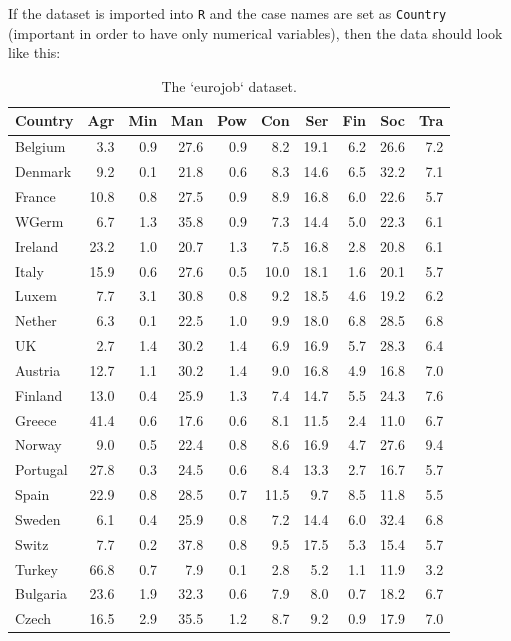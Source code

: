 \documentclass[]{book}
\theoremstyle{definition}
\theoremstyle{definition}
\theoremstyle{definition}
\theoremstyle{remark}
\begin{document}
If the dataset is imported into \texttt{R} and the case names are set as
\texttt{Country} (important in order to have only numerical variables),
then the data should look like this:

\begin{longtable}[t]{lrrrrrrrrr}
\caption{\label{tab:eurotable}The `eurojob` dataset.}\\
\toprule
Country & Agr & Min & Man & Pow & Con & Ser & Fin & Soc & Tra\\
\midrule
Belgium & 3.3 & 0.9 & 27.6 & 0.9 & 8.2 & 19.1 & 6.2 & 26.6 & 7.2\\
Denmark & 9.2 & 0.1 & 21.8 & 0.6 & 8.3 & 14.6 & 6.5 & 32.2 & 7.1\\
France & 10.8 & 0.8 & 27.5 & 0.9 & 8.9 & 16.8 & 6.0 & 22.6 & 5.7\\
WGerm & 6.7 & 1.3 & 35.8 & 0.9 & 7.3 & 14.4 & 5.0 & 22.3 & 6.1\\
Ireland & 23.2 & 1.0 & 20.7 & 1.3 & 7.5 & 16.8 & 2.8 & 20.8 & 6.1\\
\addlinespace
Italy & 15.9 & 0.6 & 27.6 & 0.5 & 10.0 & 18.1 & 1.6 & 20.1 & 5.7\\
Luxem & 7.7 & 3.1 & 30.8 & 0.8 & 9.2 & 18.5 & 4.6 & 19.2 & 6.2\\
Nether & 6.3 & 0.1 & 22.5 & 1.0 & 9.9 & 18.0 & 6.8 & 28.5 & 6.8\\
UK & 2.7 & 1.4 & 30.2 & 1.4 & 6.9 & 16.9 & 5.7 & 28.3 & 6.4\\
Austria & 12.7 & 1.1 & 30.2 & 1.4 & 9.0 & 16.8 & 4.9 & 16.8 & 7.0\\
\addlinespace
Finland & 13.0 & 0.4 & 25.9 & 1.3 & 7.4 & 14.7 & 5.5 & 24.3 & 7.6\\
Greece & 41.4 & 0.6 & 17.6 & 0.6 & 8.1 & 11.5 & 2.4 & 11.0 & 6.7\\
Norway & 9.0 & 0.5 & 22.4 & 0.8 & 8.6 & 16.9 & 4.7 & 27.6 & 9.4\\
Portugal & 27.8 & 0.3 & 24.5 & 0.6 & 8.4 & 13.3 & 2.7 & 16.7 & 5.7\\
Spain & 22.9 & 0.8 & 28.5 & 0.7 & 11.5 & 9.7 & 8.5 & 11.8 & 5.5\\
\addlinespace
Sweden & 6.1 & 0.4 & 25.9 & 0.8 & 7.2 & 14.4 & 6.0 & 32.4 & 6.8\\
Switz & 7.7 & 0.2 & 37.8 & 0.8 & 9.5 & 17.5 & 5.3 & 15.4 & 5.7\\
Turkey & 66.8 & 0.7 & 7.9 & 0.1 & 2.8 & 5.2 & 1.1 & 11.9 & 3.2\\
Bulgaria & 23.6 & 1.9 & 32.3 & 0.6 & 7.9 & 8.0 & 0.7 & 18.2 & 6.7\\
Czech & 16.5 & 2.9 & 35.5 & 1.2 & 8.7 & 9.2 & 0.9 & 17.9 & 7.0\\

\end{longtable}
\end{document}
